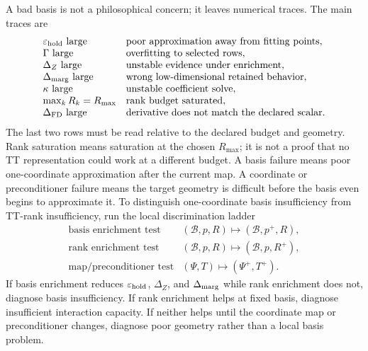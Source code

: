 \documentclass[11pt]{article}
\numberwithin{equation}{section}
\begin{document}
A bad basis is not a philosophical concern; it leaves numerical traces.  The
main traces are
\begin{equation}
\begin{array}{ll}
\varepsilon_{\rm hold}\text{ large} & \text{poor approximation away from fitting points},\\
\Gamma\text{ large} & \text{overfitting to selected rows},\\
\Delta_Z\text{ large} & \text{unstable evidence under enrichment},\\
\Delta_{\rm marg}\text{ large} & \text{wrong low-dimensional retained behavior},\\
\kappa\text{ large} & \text{unstable coefficient solve},\\
\max_kR_k=R_{\max} & \text{rank budget saturated},\\
\Delta_{\rm FD}\text{ large} & \text{derivative does not match the declared scalar}.
\end{array}
    \label{eq:p33-bad-basis-traces}
\end{equation}
The last two rows must be read relative to the declared budget and geometry.
Rank saturation means saturation at the chosen \(R_{\max}\); it is not a proof
that no TT representation could work at a different budget.  A basis failure
means poor one-coordinate approximation after the current map.  A coordinate
or preconditioner failure means the target geometry is difficult before the
basis even begins to approximate it.
To distinguish one-coordinate basis insufficiency from TT-rank insufficiency,
run the local discrimination ladder
\begin{equation}
\begin{array}{ll}
\text{basis enrichment test} &
    (\mathcal B,p,R)\mapsto(\mathcal B,p^+,R),\\
\text{rank enrichment test} &
    (\mathcal B,p,R)\mapsto(\mathcal B,p,R^+),\\
\text{map/preconditioner test} &
    (\Psi,T)\mapsto(\Psi^+,T^+).
\end{array}
    \label{eq:p33-discrimination-ladder}
\end{equation}
If basis enrichment reduces \(\varepsilon_{\rm hold}\), \(\Delta_Z\), and
\(\Delta_{\rm marg}\) while rank enrichment does not, diagnose basis
insufficiency.  If rank enrichment helps at fixed basis, diagnose insufficient
interaction capacity.  If neither helps until the coordinate map or
preconditioner changes, diagnose poor geometry rather than a local basis
problem.
\end{document}
